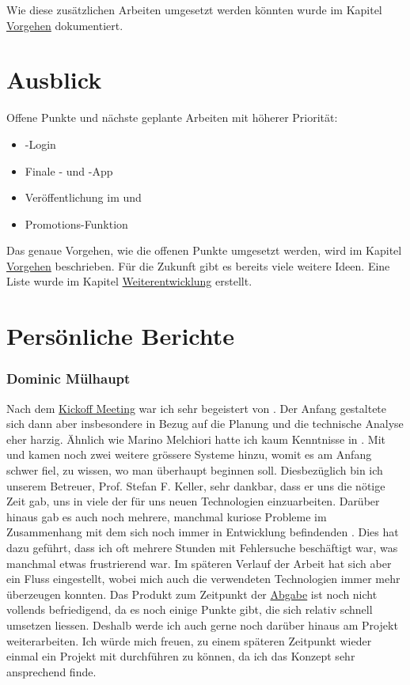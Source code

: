 Wie diese zusätzlichen Arbeiten umgesetzt werden könnten wurde im Kapitel \hyperref[pd-weiterentwicklung-vorgehen]{Vorgehen} dokumentiert.

\section{Ausblick}
Offene Punkte und nächste geplante Arbeiten mit höherer Priorität:

\begin{itemize}
	\item {}-Login
	\item Finale - und -App
	\item Veröffentlichung im  und  
	\item Promotions-Funktion
\end{itemize}

Das genaue Vorgehen, wie die offenen Punkte umgesetzt werden, wird im Kapitel \hyperref[pd-weiterentwicklung-vorgehen]{Vorgehen} beschrieben.
Für die Zukunft gibt es bereits viele weitere Ideen. 
Eine Liste wurde im Kapitel \hyperref[pd-weiterentwicklung-realistisch]{Weiterentwicklung} erstellt. 

\section{Persönliche Berichte}
\subsubsection{Dominic Mülhaupt}
Nach dem \hyperref[pm-ms1]{Kickoff Meeting} war ich sehr begeistert von \kort{}.
Der Anfang gestaltete sich dann aber insbesondere in Bezug auf die Planung und die technische Analyse eher harzig.
Ähnlich wie Marino Melchiori hatte ich kaum Kenntnisse in .
Mit  und  kamen noch zwei weitere grössere Systeme hinzu, womit es am Anfang schwer fiel, zu wissen, wo man überhaupt beginnen soll.
Diesbezüglich bin ich unserem Betreuer, Prof. Stefan F. Keller, sehr dankbar, dass er uns die nötige Zeit gab, uns in viele der für uns neuen Technologien einzuarbeiten.\newline
Darüber hinaus gab es auch noch mehrere, manchmal kuriose Probleme im Zusammenhang mit dem sich noch immer in Entwicklung befindenden .
Dies hat dazu geführt, dass ich oft mehrere Stunden mit Fehlersuche beschäftigt war, was manchmal etwas frustrierend war.
Im späteren Verlauf der Arbeit hat sich aber ein Fluss eingestellt, wobei mich auch die verwendeten Technologien immer mehr überzeugen konnten.
Das Produkt zum Zeitpunkt der \hyperref[pm-ms7]{Abgabe} ist noch nicht vollends befriedigend, da es noch einige Punkte gibt, die sich relativ schnell umsetzen liessen.
Deshalb werde ich auch gerne noch darüber hinaus am Projekt weiterarbeiten.\newline
Ich würde mich freuen, zu einem späteren Zeitpunkt wieder einmal ein Projekt mit  durchführen zu können, da ich das Konzept sehr ansprechend finde.

